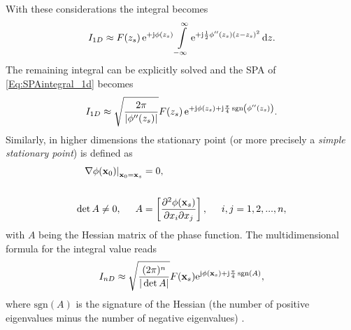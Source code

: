 With these considerations the integral becomes
\begin{align}
I_{1D} \approx F(z_s)\,\mathrm{e}^{+\mathrm{j}\phi(z_s)} 
\int\limits_{-\infty}^{\infty} \mathrm{e}^{+\mathrm{j} \frac{1}{2}\phi''(z_s)(z-z_s)^2} \, \mathrm{d} z.
\end{align}
The remaining integral can be explicitly solved and the SPA of \eqref{Eq:SPAintegral_1d} becomes \cite[Ch.\ 2.8]{Blenstein1975}
\begin{equation}
\label{Eq:SPAResult}
I_{1D} \approx \sqrt{\frac{2\pi}{| \phi''(z_s) |}} F(z_s) \, \mathrm{e}^{+\mathrm{j} \phi(z_s) + \mathrm{j} \frac{\pi}{4}\,\mathrm{sgn}\left(  \phi''(z_s) \right)}.
\end{equation}
\vspace{3mm}
Similarly, in higher dimensions the stationary point (or more precisely a \emph{simple stationary point}) is defined as
\begin{align}
\label{Eq:ndim_stat_point}
\begin{split}
\left.
\nabla \phi(\vxo)\right|_{\vxo = \vx_s} &= 0,
\\ \vspace{3mm} \\
\det A \neq 0,
\hspace{5mm} 
A &= \left[
\frac{\partial^2 \phi(\vx_s)}{\partial x_i \partial x_j} 
\right],
\hspace{5mm}
i,j = 1,2,...,n,
\end{split}
\end{align}
with $A$ being the Hessian matrix of the phase function.
The multidimensional formula for the integral value reads
\begin{equation}
\label{Eq:SPAResult_nd}
I_{nD} \approx \sqrt{\frac{(2\pi)^n}{|\det A|}} F(\mathbf{x}_s) \mathrm{e}^{\mathrm{j} \phi(\mathbf{x}_s) + \mathrm{j} \frac{\pi}{4}\,\mathrm{sgn}\left( A \right)},
\end{equation}
where $\mathrm{sgn}\left( A \right)$ is the signature of the Hessian (the number of positive eigenvalues minus the number of negative eigenvalues) \cite{Bleistein2000}.

